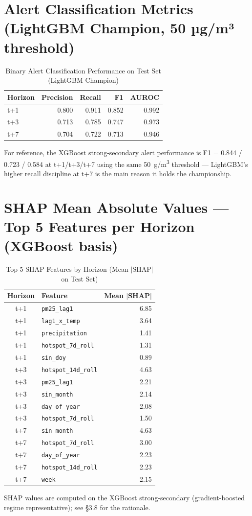 \section{Alert Classification Metrics (LightGBM Champion, 50 µg/m³ threshold)}

\begin{table}[H]
\centering
\caption{Binary Alert Classification Performance on Test Set (LightGBM Champion)}
\begin{tabular}{lrrrr}
\toprule
\textbf{Horizon} & \textbf{Precision} & \textbf{Recall} & \textbf{F1} & \textbf{AUROC} \\
\midrule
t+1 & 0.800 & 0.911 & 0.852 & 0.992 \\
t+3 & 0.713 & 0.785 & 0.747 & 0.973 \\
t+7 & 0.704 & 0.722 & 0.713 & 0.946 \\
\bottomrule
\end{tabular}
\end{table}

For reference, the XGBoost strong-secondary alert performance is
F1 = 0.844 / 0.723 / 0.584 at t+1/t+3/t+7 using the same 50~\textmu g/m\textsuperscript{3}
threshold --- LightGBM's higher recall discipline at t+7 is the main reason it
holds the championship.

\section{SHAP Mean Absolute Values — Top 5 Features per Horizon (XGBoost basis)}

\begin{table}[H]
\centering
\caption{Top-5 SHAP Features by Horizon (Mean $|$SHAP$|$ on Test Set)}
\begin{tabular}{clr}
\toprule
\textbf{Horizon} & \textbf{Feature} & \textbf{Mean $|$SHAP$|$} \\
\midrule
t+1 & \texttt{pm25\_lag1}        & 6.85 \\
t+1 & \texttt{lag1\_x\_temp}     & 3.64 \\
t+1 & \texttt{precipitation}     & 1.41 \\
t+1 & \texttt{hotspot\_7d\_roll} & 1.31 \\
t+1 & \texttt{sin\_doy}          & 0.89 \\
\midrule
t+3 & \texttt{hotspot\_14d\_roll} & 4.63 \\
t+3 & \texttt{pm25\_lag1}         & 2.21 \\
t+3 & \texttt{sin\_month}         & 2.14 \\
t+3 & \texttt{day\_of\_year}      & 2.08 \\
t+3 & \texttt{hotspot\_7d\_roll}  & 1.50 \\
\midrule
t+7 & \texttt{sin\_month}         & 4.63 \\
t+7 & \texttt{hotspot\_7d\_roll}  & 3.00 \\
t+7 & \texttt{day\_of\_year}      & 2.23 \\
t+7 & \texttt{hotspot\_14d\_roll} & 2.23 \\
t+7 & \texttt{week}               & 2.15 \\
\bottomrule
\end{tabular}
\end{table}

SHAP values are computed on the XGBoost strong-secondary (gradient-boosted
regime representative); see §3.8 for the rationale.

